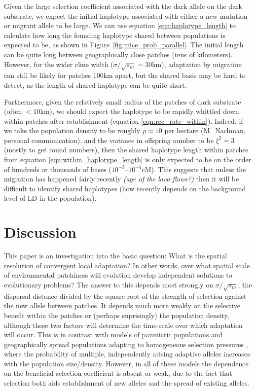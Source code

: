 \documentclass{article}
\newcommand{\plr}[1]{{\it\color{blue}(#1)}}
\begin{document}
Given the large selection coefficient associated with the dark allele
on the dark substrate, we expect the initial haplotype associated with
either a new mutation or migrant allele to be large. 
We can use equation \eqref{eqn:haplotype_length} to calculate how long the founding
haplotype shared between populations is expected to be,
as shown in Figure~\ref{fig:mice_prob_parallel}. 
The initial length can be quite long between geographically close patches (tens of kilometers). 
However, for the wider cline width ($\sigma/\sqrt{s_m} = 30$km), 
adaptation by migration can still be likely for patches 100km apart, 
but the shared basis may be hard to detect, as the length of shared haplotype can be quite short. 

Furthermore, given the relatively small radius of the patches of dark substrate (often $<10$km),
we should expect the haplotype to be rapidly whittled down within patches after establishment (equation \ref{eqn:rec_rate_within}).
Indeed, if we take the population density to be roughly $\rho \approx 10$ per hectare (M.~Nachman, personal communication),
and the variance in offspring number to be $\xi^2 = 3$ (mostly to get round numbers),
then the shared haplotype length within patches from equation \eqref{eqn:within_haplotype_length}
is only expected to be on the order of hundreds or thousands of bases
($10^{-3}$--$10^{-4}$cM).
This suggests that unless the migration has happened fairly recently \plr{age of the lava flows?}
then it will be difficult to identify shared haplotypes
(how recently depends on the background level of LD in the population).


\section{Discussion} 
\label{ss:discussion}

This paper is an investigation into the basic question: 
What is the spatial resolution of convergent local adaptation?
In other words, 
over what spatial scale of environmental patchiness will evolution develop independent solutions to evolutionary problems?
The answer to this depends most strongly on $\sigma/\sqrt{s_m}$, 
the dispersal distance divided by the square root of the strength of selection
against the new allele between patches. It depends much more weakly on the
selective benefit within the patches or (perhaps suprisingly) the population density, 
although these two factors will determine the time-scale over which adaptation will occur. 
This is in contrast with models of panmictic populations \citep{softsweepsI} 
and geographically spread populations adapting to homogeneous selection pressures \citep{ralph2010parallel}, 
where the probability of multiple, independently arising adaptive alleles increases with the population size/density. 
However, in all of these models the dependence on the beneficial selection
coefficient is absent or weak, due to the fact that selection both
aids establishment of new alleles and the spread of existing
alleles. 
\end{document}
